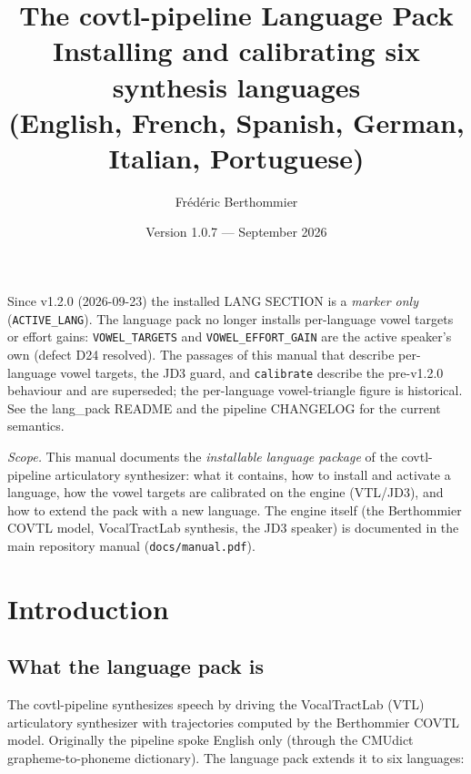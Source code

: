 \documentclass[11pt,a4paper]{article}
\title{\textbf{The covtl-pipeline Language Pack}\\[0.4em]
\large Installing and calibrating six synthesis languages\\
(English, French, Spanish, German, Italian, Portuguese)}
\author{Fr\'ed\'eric Berthommier}
\date{Version 1.0.7 --- September 2026}
\newcommand{\code}[1]{\texttt{#1}}
\begin{document}
\begin{warning}
Since v1.2.0 (2026-09-23) the installed LANG SECTION is a \emph{marker only} (\code{ACTIVE\_LANG}). The language pack no longer installs per-language vowel targets or effort gains: \code{VOWEL\_TARGETS} and \code{VOWEL\_EFFORT\_GAIN} are the active speaker’s own (defect D24 resolved). The passages of this manual that describe per-language vowel targets, the JD3 guard, and \code{calibrate} describe the pre-v1.2.0 behaviour and are superseded; the per-language vowel-triangle figure is historical. See the lang\_pack README and the pipeline CHANGELOG for the current semantics.
\end{warning}


\maketitle

\begin{center}
\begin{minipage}{0.86\textwidth}
\small\emph{Scope.} This manual documents the \emph{installable
language package} of the covtl-pipeline articulatory synthesizer: what
it contains, how to install and activate a language, how the vowel
targets are calibrated on the engine (VTL/JD3), and how to extend the
pack with a new language. The engine itself (the Berthommier COVTL
model, VocalTractLab synthesis, the JD3 speaker) is documented in the
main repository manual (\code{docs/manual.pdf}).
\end{minipage}
\end{center}

\vspace{0.5em}
\tableofcontents
\vspace{1em}

\section{Introduction}

\subsection{What the language pack is}

The covtl-pipeline synthesizes speech by driving the VocalTractLab
(VTL) articulatory synthesizer with trajectories computed by the
Berthommier COVTL model. Originally the pipeline spoke English only
(through the CMUdict grapheme-to-phoneme dictionary). The language
pack extends it to six languages:
\end{document}
